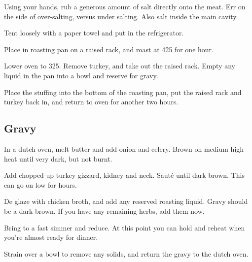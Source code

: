 \begin{recipe}
Using your hands, rub a generous amount of salt directly onto the meat. Err on the side of over-salting, versus under salting. Also salt inside the main cavity.

Tent loosely with a paper towel and put in the refrigerator.

Place in roasting pan on a raised rack, and roast at 425\degree{} for one hour.

Lower oven to 325\degree{}. Remove turkey, and take out the raised rack. Empty any liquid in the pan into a bowl and reserve for gravy.

Place the stuffing into the bottom of the roasting pan, put the raised rack and turkey back in, and return to oven for another two hours.

\newpage
\subsection{Gravy}



In a dutch oven, melt butter and add onion and celery. Brown on medium high heat until very dark, but not burnt.

Add chopped up turkey gizzard, kidney and neck. Sauté until dark brown. This can go on low for hours.


De glaze with chicken broth, and add any reserved roasting liquid. Gravy should be a dark brown. If you have any remaining herbs, add them now.

Bring to a fast simmer and reduce. At this point you can hold and reheat when you're almost ready for dinner.

Strain over a bowl to remove any solids, and return the gravy to the dutch oven.



\end{recipe}
